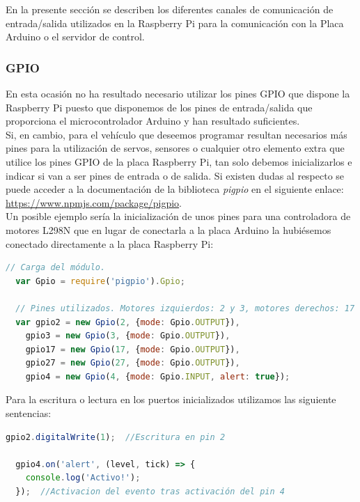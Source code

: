 En la presente sección se describen los diferentes canales de comunicación de entrada/salida utilizados en la Raspberry Pi para la comunicación con la Placa Arduino o el servidor de control.\\

\subsubsection{GPIO}

En esta ocasión no ha resultado necesario utilizar los pines GPIO que dispone la Raspberry Pi puesto que disponemos de los pines de entrada/salida que proporciona
el microcontrolador Arduino y han resultado suficientes.\\

Si, en cambio, para el vehículo que deseemos programar resultan necesarios más pines para la utilización de servos, sensores o cualquier otro elemento extra que utilice los pines
GPIO de la placa Raspberry Pi, tan solo debemos inicializarlos e indicar si van a ser pines de entrada o de salida. Si existen dudas al respecto se puede acceder a la documentación de
la biblioteca \emph{pigpio} en el siguiente enlace: \url{https://www.npmjs.com/package/pigpio}.\\

Un posible ejemplo sería la inicialización de unos pines para una controladora de motores L298N que en lugar de conectarla a la placa Arduino la hubiésemos conectado directamente a 
la placa Raspberry Pi:\\

\begin{lstlisting}[language=JavaScript]
  // Carga del módulo.
  var Gpio = require('pigpio').Gpio;

  // Pines utilizados. Motores izquierdos: 2 y 3, motores derechos: 17 y 27
  var gpio2 = new Gpio(2, {mode: Gpio.OUTPUT}),
    gpio3 = new Gpio(3, {mode: Gpio.OUTPUT}),
    gpio17 = new Gpio(17, {mode: Gpio.OUTPUT}),
    gpio27 = new Gpio(27, {mode: Gpio.OUTPUT}),
    gpio4 = new Gpio(4, {mode: Gpio.INPUT, alert: true});
\end{lstlisting}


Para la escritura o lectura en los puertos inicializados utilizamos las siguiente sentencias:\\

\begin{lstlisting}[language=JavaScript]
  gpio2.digitalWrite(1);  //Escritura en pin 2
  
  gpio4.on('alert', (level, tick) => {
    console.log('Activo!');
  });  //Activacion del evento tras activación del pin 4
\end{lstlisting}


